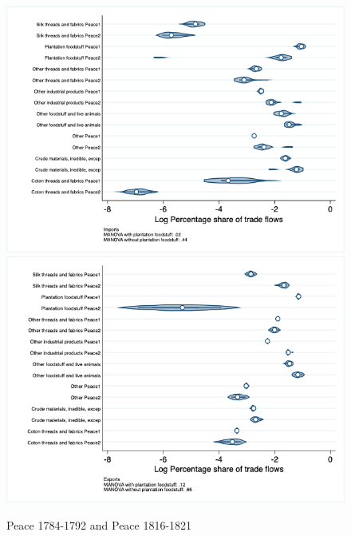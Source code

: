 \documentclass[12pt,a4paper,notitlepage,english]{article}
\begin{document}
\begin{figure}
\centering
\caption{Peace 1784-1792 and Peace 1816-1821}
\label{peace1784_1792_peace1816_1840_nat_distr_Iaggr}
\includegraphics[scale=.4]{peace1784_1792_peace1816_1840_nat_distr_Iaggr}
\includegraphics[scale=.4]{peace1784_1792_peace1816_1840_nat_distr_Xaggr}
\end{figure}
\end{document}

